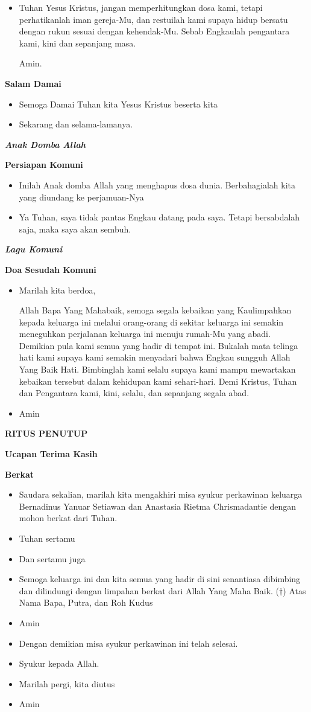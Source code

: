 \documentclass[a5paper,headsepline,titlepage,10pt,normalheadings,DIVcalc]{scrbook}
\makeatletter
\newcommand{\judul}[1]{%
  {\parindent \z@ \centering \normalfont
    \interlinepenalty\@M \Large \bfseries #1\par\nobreak \vskip 20\p@ }}
\newcommand{\subjudul}[1]{%
  {\parindent \z@ \normalfont
    \interlinepenalty\@M \bfseries #1\par\nobreak \vskip 20\p@ }}
\newcommand{\lagu}[1]{%
  {\parindent \z@ \normalfont
    \interlinepenalty\@M \bfseries \emph{#1}\par\nobreak \vskip 20\p@ }}
\newcommand{\BU}[1]{\begin{itemize} \item[U:] #1 \end{itemize}}
\newcommand{\BI}[1]{\begin{itemize} \item[I:] #1 \end{itemize}}
\newcommand{\suami}{Bernadinus Yanuar Setiawan }
\newcommand{\istri}{Anastasia Rietma Chrismadantie }
\makeatother
\begin{document}
\BU{Tuhan Yesus Kristus, jangan memperhitungkan dosa kami, tetapi perhatikanlah iman gereja-Mu, dan restuilah kami supaya hidup bersatu dengan rukun sesuai dengan kehendak-Mu. Sebab Engkaulah pengantara kami, kini dan sepanjang masa.

Amin.}

\subjudul{Salam Damai}

\BI{Semoga Damai Tuhan kita Yesus Kristus beserta kita}

\BU{Sekarang dan selama-lamanya.}

\lagu{Anak Domba Allah}

\subjudul{Persiapan Komuni}

\BI{Inilah Anak domba Allah yang menghapus dosa dunia. Berbahagialah kita yang diundang ke perjamuan-Nya}
\BU{Ya Tuhan, saya tidak pantas Engkau datang pada saya. Tetapi bersabdalah saja, maka saya akan sembuh.}

\lagu{Lagu Komuni}

\subjudul{Doa Sesudah Komuni}

\BI{Marilah kita berdoa,

Allah Bapa Yang Mahabaik, semoga segala kebaikan yang Kaulimpahkan kepada keluarga ini melalui orang-orang di sekitar keluarga ini semakin meneguhkan perjalanan keluarga ini menuju rumah-Mu yang abadi. Demikian pula kami semua yang hadir di tempat ini. Bukalah mata telinga hati kami supaya kami semakin menyadari bahwa Engkau sungguh Allah Yang Baik Hati. Bimbinglah kami selalu supaya kami mampu mewartakan kebaikan tersebut dalam kehidupan kami sehari-hari. Demi Kristus, Tuhan dan Pengantara kami, kini, selalu, dan sepanjang segala abad.}

\BU{Amin}

\judul{RITUS PENUTUP}

\subjudul{Ucapan Terima Kasih}

\subjudul{Berkat}

\BI{Saudara sekalian, marilah kita mengakhiri misa syukur perkawinan keluarga \suami dan \istri dengan mohon berkat dari Tuhan.}
\BI{Tuhan sertamu}
\BU{Dan sertamu juga}
\BI{Semoga keluarga ini dan kita semua yang hadir di sini senantiasa dibimbing dan dilindungi dengan limpahan berkat dari Allah Yang Maha Baik. ($\dagger$) Atas Nama Bapa, Putra, dan Roh Kudus}
\BU{Amin}
\BI{Dengan demikian misa syukur perkawinan ini telah selesai.}
\BU{Syukur kepada Allah.}
\BI{Marilah pergi, kita diutus}
\BU{Amin}
\end{document}
